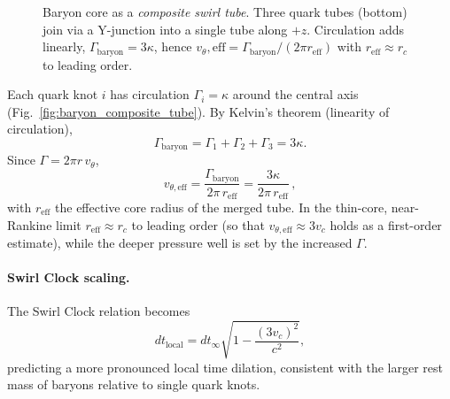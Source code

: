\documentclass[11pt]{article}
\begin{document}
\begin{figure}[htbp]
{
        }
        \caption{Baryon core as a \emph{composite swirl tube}. Three quark tubes (bottom) join via a Y-junction into a single tube along $+z$. Circulation adds linearly, $\Gamma_\text{baryon}=3\kappa$, hence $v_\theta , \textrm{eff}=\Gamma_\text{baryon}/(2\pi r_\text{eff})$ with $r_\text{eff}\approx r_c$ to leading order.}
        \label{fig:three-knot-gallery}
    \end{figure}

    Each quark knot $i$ has circulation $\Gamma_i = \kappa$ around the central axis (Fig.~\ref{fig:baryon_composite_tube}).
    By Kelvin’s theorem (linearity of circulation),
        \begin{equation}
            \Gamma_{\mathrm{baryon}}=\Gamma_1+\Gamma_2+\Gamma_3=3\kappa.
        \end{equation}
        Since $\Gamma=2\pi r\,v_\theta$,
        \begin{equation}
            \boxed{\;
            v_{\theta,\mathrm{eff}}=\frac{\Gamma_{\mathrm{baryon}}}{2\pi\,r_{\mathrm{eff}}}
                =\frac{3\kappa}{2\pi\,r_{\mathrm{eff}}}\,,
                \;}\label{eq:baryon-vtheta}
        \end{equation}
        with $r_{\mathrm{eff}}$ the effective core radius of the merged tube. In the thin-core, near-Rankine limit $r_{\mathrm{eff}}\approx r_c$ to leading order (so that $v_{\theta,\mathrm{eff}}\approx 3 v_c$ holds as a first-order estimate), while the deeper pressure well is set by the increased $\Gamma$.

        \paragraph{Swirl Clock scaling.}
        The Swirl Clock relation becomes
        \begin{equation}
            dt_{\mathrm{local}} = dt_\infty \sqrt{1 - \frac{(3 v_c)^2}{c^2}},\label{eq:baryon-swirl-clock}
        \end{equation}
        predicting a more pronounced local time dilation, consistent with the larger rest mass of baryons relative to single quark knots.
\end{document}
